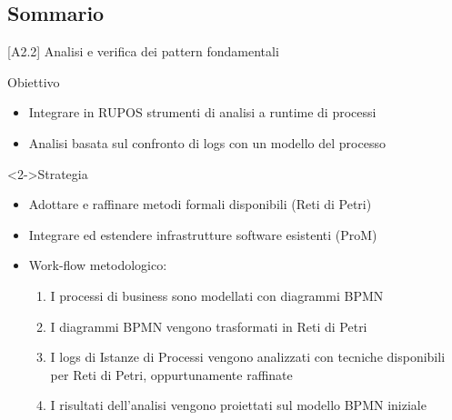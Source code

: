 \documentclass[10pt]{beamer}
\begin{document}
\subsection{Sommario}
\begin{frame}{[A2.2] Analisi e verifica dei pattern fondamentali}
  \begin{block}{Obiettivo}
\begin{itemize}
  \item Integrare in RUPOS strumenti di analisi a runtime di processi
  \item  Analisi basata sul confronto di logs con un modello del processo
\end{itemize}
\end{block}

  \begin{block}<2->{Strategia}
    \begin{itemize}
    \item Adottare e raffinare  metodi formali disponibili (Reti di Petri)
    \item Integrare ed estendere infrastrutture software esistenti (ProM)
    \item Work-flow metodologico:
      \begin{enumerate}
      \item I processi di business sono modellati con diagrammi BPMN
      \item I diagrammi BPMN vengono trasformati in Reti di Petri
      \item I logs di Istanze di Processi vengono analizzati con tecniche disponibili per Reti di Petri, oppurtunamente raffinate
      \item I risultati dell'analisi vengono proiettati sul modello BPMN iniziale
      \end{enumerate}
    \end{itemize}

  \end{block}
\end{frame}




\end{document}
